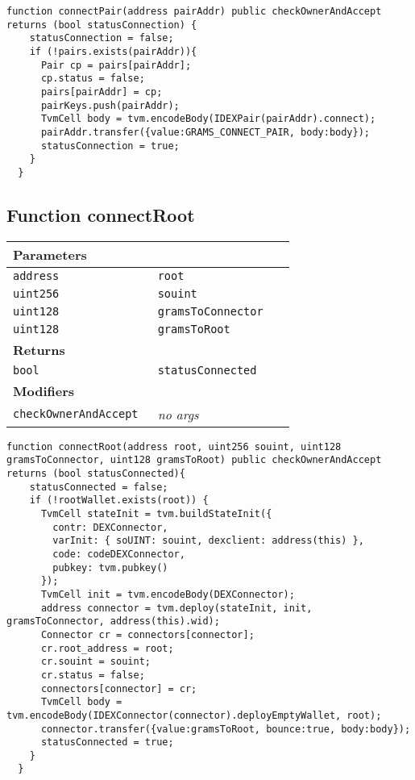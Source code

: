 \vspace{2cm}

\begin{lstlisting}[firstnumber=92]
  function connectPair(address pairAddr) public checkOwnerAndAccept  returns (bool statusConnection) {
    statusConnection = false;
    if (!pairs.exists(pairAddr)){
      Pair cp = pairs[pairAddr];
      cp.status = false;
      pairs[pairAddr] = cp;
      pairKeys.push(pairAddr);
      TvmCell body = tvm.encodeBody(IDEXPair(pairAddr).connect);
      pairAddr.transfer({value:GRAMS_CONNECT_PAIR, body:body});
      statusConnection = true;
    }
  }
\end{lstlisting}

\subsection{Function connectRoot}


\ifsoltables
\noindent\begin{tabular}{|l|l|p{5cm}|}\hline
\multicolumn{3}{|l|}{\bf Parameters}\\\hline
\tt address & \tt root &\\\hline
\tt uint256 & \tt souint &\\\hline
\tt uint128 & \tt gramsToConnector &\\\hline
\tt uint128 & \tt gramsToRoot &\\\hline
\multicolumn{3}{|l|}{\bf Returns}\\\hline
\tt bool & \tt statusConnected &\\\hline
\multicolumn{3}{|l|}{\bf Modifiers}\\\hline
\tt checkOwnerAndAccept & {\em no args} &\\\hline
\end{tabular}
\fi

\vspace{2cm}

\begin{lstlisting}[firstnumber=158]
  function connectRoot(address root, uint256 souint, uint128 gramsToConnector, uint128 gramsToRoot) public checkOwnerAndAccept returns (bool statusConnected){
    statusConnected = false;
    if (!rootWallet.exists(root)) {
      TvmCell stateInit = tvm.buildStateInit({
        contr: DEXConnector,
        varInit: { soUINT: souint, dexclient: address(this) },
        code: codeDEXConnector,
        pubkey: tvm.pubkey()
      });
      TvmCell init = tvm.encodeBody(DEXConnector);
      address connector = tvm.deploy(stateInit, init, gramsToConnector, address(this).wid);
      Connector cr = connectors[connector];
      cr.root_address = root;
      cr.souint = souint;
      cr.status = false;
      connectors[connector] = cr;
      TvmCell body = tvm.encodeBody(IDEXConnector(connector).deployEmptyWallet, root);
      connector.transfer({value:gramsToRoot, bounce:true, body:body});
      statusConnected = true;
    }
  }
\end{lstlisting}

